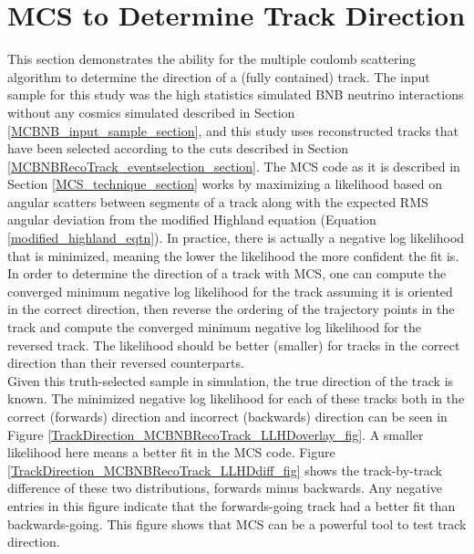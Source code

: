 \section{MCS to Determine Track Direction}\label{TrackDirection_MCBNBRecoTrack_section}
This section demonstrates the ability for the multiple coulomb scattering algorithm to determine the direction of a (fully contained) track. The input sample for this study was the high statistics simulated BNB neutrino interactions without any cosmics simulated described in Section \ref{MCBNB_input_sample_section}, and this study uses reconstructed tracks that have been selected according to the cuts described in Section \ref{MCBNBRecoTrack_eventselection_section}. The MCS code as it is described in Section \ref{MCS_technique_section} works by maximizing a likelihood based on angular scatters between segments of a track along with the expected RMS angular deviation from the modified Highland equation (Equation \ref{modified_highland_eqtn}). In practice, there is actually a negative log likelihood that is minimized, meaning the lower the likelihood the more confident the fit is. In order to determine the direction of a track with MCS, one can compute the converged minimum negative log likelihood for the track assuming it is oriented in the correct direction, then reverse the ordering of the trajectory points in the track and compute the converged minimum negative log likelihood for the reversed track. The likelihood should be better (smaller) for tracks in the correct direction than their reversed counterparts.\\

Given this truth-selected sample in simulation, the true direction of the track is known. The minimized negative log likelihood for each of these tracks both in the correct (forwards) direction and incorrect (backwards) direction can be seen in Figure \ref{TrackDirection_MCBNBRecoTrack_LLHDoverlay_fig}. A smaller likelihood here means a better fit in the MCS code. Figure \ref{TrackDirection_MCBNBRecoTrack_LLHDdiff_fig} shows the track-by-track difference of these two distributions, forwards minus backwards. Any negative entries in this figure indicate that the forwards-going track had a better fit than backwards-going. This figure shows that MCS can be a powerful tool to test track direction.


